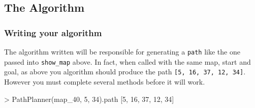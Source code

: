 \documentclass[11pt]{article}
\newenvironment{Shaded}{}{}
\newcommand{\NormalTok}[1]{{#1}}
\newcommand{\OperatorTok}[1]{\textcolor[rgb]{0.40,0.40,0.40}{{#1}}}
\newcommand{\ExtensionTok}[1]{{#1}}
\begin{document}
    
    
    \hypertarget{the-algorithm}{%
\subsection{The Algorithm}\label{the-algorithm}}

\hypertarget{writing-your-algorithm}{%
\subsubsection{Writing your algorithm}\label{writing-your-algorithm}}

The algorithm written will be responsible for generating a \texttt{path}
like the one passed into \texttt{show\_map} above. In fact, when called
with the same map, start and goal, as above you algorithm should produce
the path \texttt{{[}5,\ 16,\ 37,\ 12,\ 34{]}}. However you must complete
several methods before it will work.

\begin{Shaded}
\begin{Highlighting}[]
\OperatorTok{>} \ExtensionTok{PathPlanner}\NormalTok{(map_40, 5, 34)}\ExtensionTok{.path}
\NormalTok{[}\ExtensionTok{5}\NormalTok{, 16, 37, 12, 34]}
\end{Highlighting}
\end{Shaded}
\end{document}
